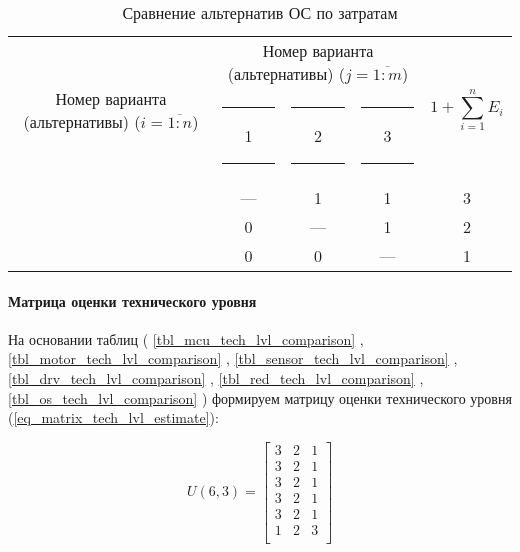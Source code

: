 \begin{table}[ht!]
    \centering
    \begin{tabular}{|c|c|c|c|c|}
        \hline
        \multirow{2}{2.4cm}[-0.5pc]{
            \centering
            Номер варианта (альтернативы) ($i = \overline{1:n}$)
        } &
        \multicolumn{3}{c|}{
            \parbox[t]{2.4cm}{
                \centering
                Номер варианта (альтернативы) ($j = \overline{1:m}$)
            }
        } &
        \multirow{2}{1.7cm}{
            \centering
            $$1 + \sum_{i=1}^n E_i$$
        } \\
        &
        \centering \rule{2pt}{0pt} 1 \rule{2pt}{0pt} &
        \centering \rule{2pt}{0pt} 2 \rule{2pt}{0pt} &
        \centering \rule{2pt}{0pt} 3 \rule{2pt}{0pt} & \\
        \hline \hline
        \centering{1} &---& 1 & 1 & 3 \\ \hline
        \centering{2} & 0 &---& 1 & 2 \\ \hline
        \centering{3} & 0 & 0 &---& 1 \\ \hline
    \end{tabular}
    \caption{Сравнение альтернатив ОС по затратам}
    \label{tbl_os_cost_lvl_comparison}
\end{table}


\paragraph{Матрица оценки технического уровня}

На основании таблиц (
    \ref{tbl_mcu_tech_lvl_comparison}
  , \ref{tbl_motor_tech_lvl_comparison}
  , \ref{tbl_sensor_tech_lvl_comparison}
  , \ref{tbl_drv_tech_lvl_comparison}
  , \ref{tbl_red_tech_lvl_comparison}
  , \ref{tbl_os_tech_lvl_comparison}
)
формируем матрицу оценки технического уровня
(\ref{eq_matrix_tech_lvl_estimate}):

\begin{equation}
    U(6,3) =
    \begin{bmatrix}
        3 & 2 & 1 \\
        3 & 2 & 1 \\
        3 & 2 & 1 \\
        3 & 2 & 1 \\
        3 & 2 & 1 \\
        1 & 2 & 3 \\
    \end{bmatrix}
    \label{eq_matrix_tech_lvl_estimate}
\end{equation}

